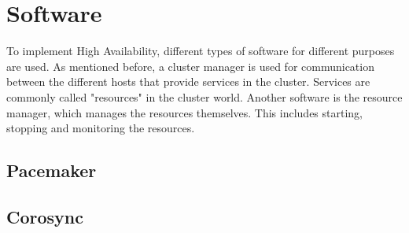 
\section{Software}
To implement High Availability, different types of software for different purposes are used.
As mentioned before, a cluster manager is used for communication between the different hosts that
provide services in the cluster. Services are commonly called "resources" in the cluster world.
Another software is the resource manager, which manages the resources themselves.
This includes starting, stopping and monitoring the resources.
\subsection{Pacemaker}
\subsection{Corosync}

